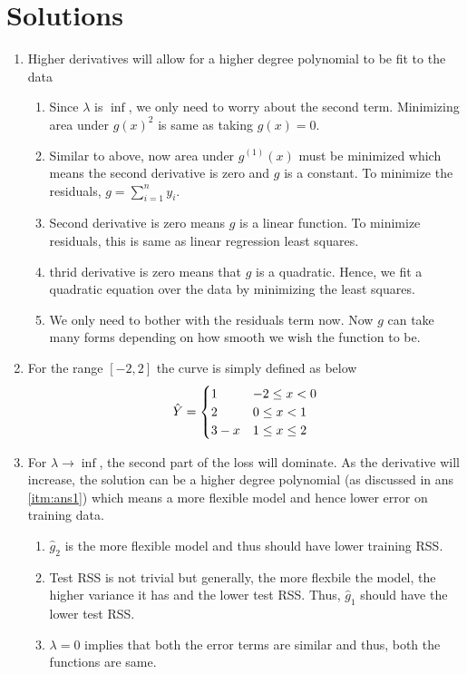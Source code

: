 \documentclass[../statistical_learning_notes.tex]{subfiles}
\begin{document}
    \section{Solutions}
    \begin{enumerate}
        \item \label{itm:ans1} Higher derivatives will allow for a higher degree polynomial to be fit to the data
        \begin{enumerate}
            \item Since $\lambda$ is $\inf$, we only need to worry about the second term. Minimizing area under $g(x)^{2}$ is same as taking $g(x) = 0$.
            \item Similar to above, now area under $g^{(1)}(x)$ must be minimized which means the second derivative is zero and $g$ is a constant. To minimize the residuals, $g = \sum_{i=1}^{n}y_{i}$.
            \item Second derivative is zero means $g$ is a linear function. To minimize residuals, this is same as linear regression least squares.
            \item thrid derivative is zero means that $g$ is a quadratic. Hence, we fit a quadratic equation over the data by minimizing the least squares.
            \item We only need to bother with the residuals term now. Now $g$ can take many forms depending on how smooth we wish the function to be.
        \end{enumerate}
        

        \item For the range $[-2,2]$ the curve is simply defined as below
        \begin{alignat*}{1}
            \hat{Y} = \begin{cases} 1     &\mbox{$-2 \leq x < 0$}\\
                                    2     &\mbox{$ 0 \leq x < 1$}\\
                                    3 - x &\mbox{$ 1 \leq x \leq 2$} \end{cases}
        \end{alignat*}
        

        \item For $\lambda \to \inf$, the second part of the loss will dominate. As the derivative will increase, the solution can be a higher degree polynomial (as discussed in ans \ref{itm:ans1}) which means a more flexible model and hence lower error on training data.
        \begin{enumerate}
            \item $\hat{g}_{2}$ is the more flexible model and thus should have lower training RSS.
            \item Test RSS is not trivial but generally, the more flexbile the model, the higher variance it has and the lower test RSS. Thus, $\hat{g}_{1}$ should have the lower test RSS.
            \item $\lambda = 0$ implies that both the error terms are similar and thus, both the functions are same.
        \end{enumerate}
    \end{enumerate}
\end{document}
